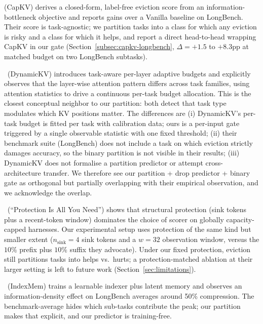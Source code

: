 \documentclass{article} %
\begin{document}
\citet{arxiv260425975}
(CapKV) derives a closed-form, label-free eviction score from an
information-bottleneck objective and reports gains over a Vanilla baseline on
LongBench. Their score is task-agnostic; we partition tasks into a class for
which any eviction is risky and a class for which it helps, and report a
direct head-to-head wrapping CapKV in our gate
(Section~\ref{subsec:capkv-longbench}, $\Delta = +1.5$ to $+8.3$pp at
matched budget on two LongBench subtasks).

\citet{arxiv241214838}~(DynamicKV) introduces task-aware per-layer adaptive
budgets and explicitly observes that the layer-wise attention pattern
differs across task families, using attention statistics to drive a
continuous per-task budget allocation. This is the closest conceptual
neighbor to our partition: both detect that task type modulates which KV
positions matter. The differences are (i) DynamicKV's per-task budget is
fitted per task with calibration data; ours is a per-input gate triggered
by a single observable statistic with one fixed threshold; (ii) their
benchmark suite (LongBench) does not include a task on which eviction
strictly damages accuracy, so the binary partition is not visible in their
results; (iii) DynamicKV does not formalise a partition predictor or
attempt cross-architecture transfer. We therefore see our partition + drop
predictor + binary gate as orthogonal but partially overlapping with their
empirical observation, and we acknowledge the overlap.

\citet{arxiv260518053}~(``Protection Is All You Need'')
shows that structural protection (sink tokens plus a recent-token window)
dominates the choice of scorer on globally capacity-capped harnesses. Our
experimental setup uses protection of the same kind but smaller extent
($n_{\text{sink}} = 4$ sink tokens and a $w = 32$ observation window, versus
the $10\%$ prefix plus $10\%$ suffix they advocate). Under our fixed
protection, eviction still partitions tasks into helps vs.\ hurts; a
protection-matched ablation at their larger setting is left to future work
(Section~\ref{sec:limitations}).

\citet{arxiv260525475}~(IndexMem) trains a learnable indexer
plus latent memory and observes an information-density effect on LongBench
averages around 50\% compression. The benchmark-average hides which sub-tasks
contribute the peak; our partition makes that explicit, and our predictor is
training-free.
\end{document}
